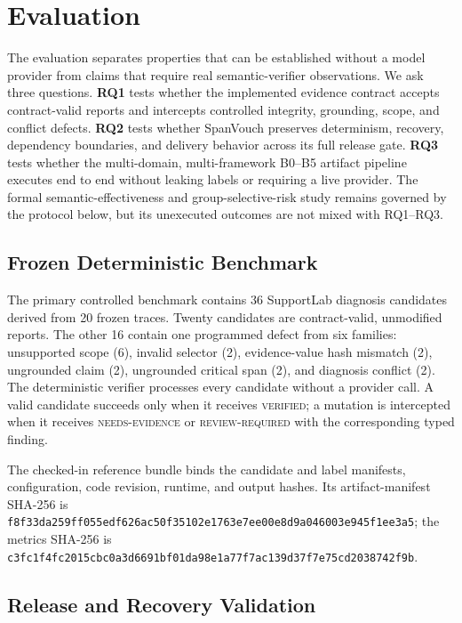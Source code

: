 \section{Evaluation}
\label{sec:experiments}

The evaluation separates properties that can be established without a model
provider from claims that require real semantic-verifier observations. We ask
three questions. \textbf{RQ1} tests whether the implemented evidence contract
accepts contract-valid reports and intercepts controlled integrity, grounding,
scope, and conflict defects. \textbf{RQ2} tests whether SpanVouch preserves
determinism, recovery, dependency boundaries, and delivery behavior across its
full release gate. \textbf{RQ3} tests whether the multi-domain,
multi-framework B0--B5 artifact pipeline executes end to end without leaking
labels or requiring a live provider. The formal semantic-effectiveness and
group-selective-risk study remains governed by the protocol below, but its
unexecuted outcomes are not mixed with RQ1--RQ3.

\subsection{Frozen Deterministic Benchmark}

The primary controlled benchmark contains 36 SupportLab diagnosis candidates
derived from 20 frozen traces. Twenty candidates are contract-valid,
unmodified reports. The other 16 contain one programmed defect from six
families: unsupported scope (6), invalid selector (2), evidence-value hash
mismatch (2), ungrounded claim (2), ungrounded critical span (2), and diagnosis
conflict (2). The deterministic verifier processes every candidate without a
provider call. A valid candidate succeeds only when it receives
\textsc{verified}; a mutation is intercepted when it receives
\textsc{needs-evidence} or \textsc{review-required} with the corresponding
typed finding.

The checked-in reference bundle binds the candidate and label manifests,
configuration, code revision, runtime, and output hashes. Its artifact-manifest
SHA-256 is
\nolinkurl{f8f33da259ff055edf626ac50f35102e1763e7ee00e8d9a046003e945f1ee3a5};
the metrics SHA-256 is
\nolinkurl{c3fc1f4fc2015cbc0a3d6691bf01da98e1a77f7ac139d37f7e75cd2038742f9b}.

\subsection{Release and Recovery Validation}

